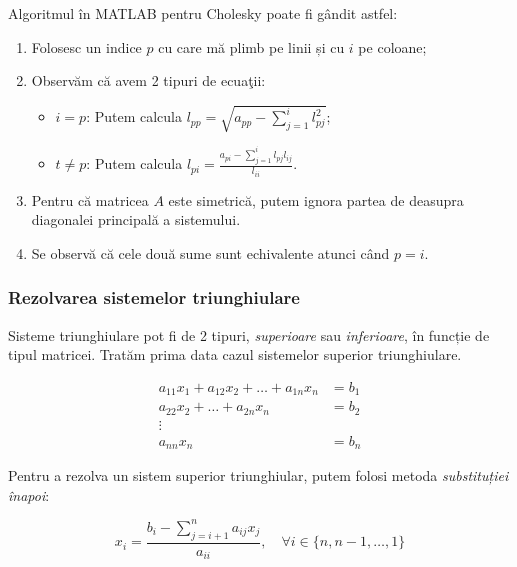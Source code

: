 \documentclass{exam}
\newcommand{\octavescript}[2]{
	
}
\begin{document}
\par Algoritmul în MATLAB pentru Cholesky poate fi gândit astfel:

\begin{enumerate}
	\item Folosesc un indice $p$ cu care mă plimb pe linii și cu $i$ pe coloane;
	\item Observăm că avem 2 tipuri de ecuaţii:
	      \begin{itemize}
		      \item $i = p$: Putem calcula $l_{pp} = \sqrt{a_{pp} - \sum_{j = 1}^{i}{l_{pj}^2}}$;
		      \item $t \neq p$: Putem calcula $l_{pi} = \frac{a_{pi} - \sum_{j = 1}^{i}{l_{pj} l_{ij}}}{l_{ii}}$.
	      \end{itemize}
	\item Pentru că matricea $A$ este simetrică, putem ignora partea de deasupra
	      diagonalei principală a sistemului.
	\item Se observă că cele două sume sunt echivalente atunci când $p = i$.
\end{enumerate}

\octavescript{./src/cholesky.m}{}

\subsubsection{Rezolvarea sistemelor triunghiulare}

\par Sisteme triunghiulare pot fi de 2 tipuri, \textit{superioare} sau
\textit{inferioare}, în funcție de tipul matricei. Tratăm prima data cazul
sistemelor superior triunghiulare.

\begin{align*}
	a_{11} x_1 + a_{12} x_2 + \ldots + a_{1n} x_n & = b_1 \\
	a_{22} x_2 + \ldots + a_{2n} x_n              & = b_2 \\
	\vdots                                                \\
	a_{nn} x_n                                    & = b_n
\end{align*}

\par Pentru a rezolva un sistem superior triunghiular, putem folosi metoda
\textit{substituției înapoi}:

\begin{equation}
	x_i = \frac{b_i - \sum_{j = i + 1}^{n}{a_{ij} x_j}}{a_{ii}}, \quad \forall i \in \{n, n - 1, \ldots, 1\}
\end{equation}
\end{document}
